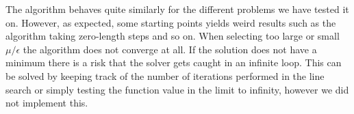 The algorithm behaves quite similarly for the different problems we have tested it on. However, as expected, some starting points yields weird results such as the algorithm taking zero-length steps and so on. When selecting too large or small $\mu/\epsilon$ the algorithm does not converge at all.  
If the solution does not have a minimum there is a risk that the solver gets caught in an infinite loop. This can be solved by keeping track of the number of iterations performed in the line search or simply testing the function value in the limit to infinity, however we did not implement this. 
